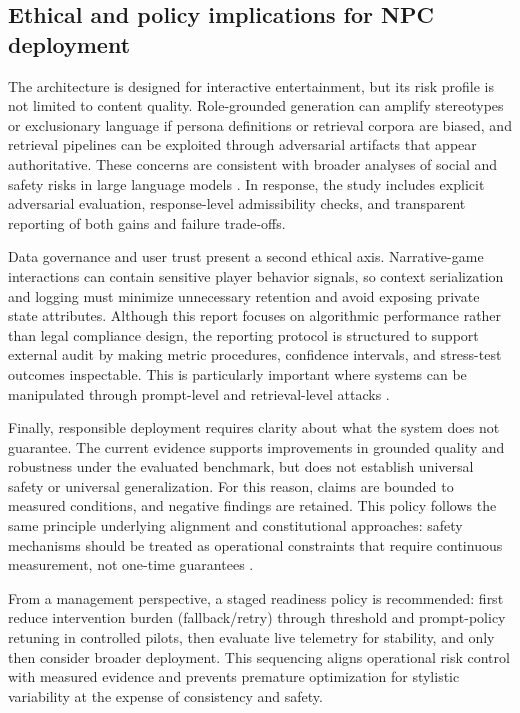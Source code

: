 ﻿\documentclass[a4paper,12pt]{article}
\begin{document}
\subsection{Ethical and policy implications for NPC deployment}
The architecture is designed for interactive entertainment, but its risk profile is not limited to content quality. Role-grounded generation can amplify stereotypes or exclusionary language if persona definitions or retrieval corpora are biased, and retrieval pipelines can be exploited through adversarial artifacts that appear authoritative. These concerns are consistent with broader analyses of social and safety risks in large language models \cite{Bender2021Parrots,Weidinger2022Taxonomy}. In response, the study includes explicit adversarial evaluation, response-level admissibility checks, and transparent reporting of both gains and failure trade-offs.

Data governance and user trust present a second ethical axis. Narrative-game interactions can contain sensitive player behavior signals, so context serialization and logging must minimize unnecessary retention and avoid exposing private state attributes. Although this report focuses on algorithmic performance rather than legal compliance design, the reporting protocol is structured to support external audit by making metric procedures, confidence intervals, and stress-test outcomes inspectable. This is particularly important where systems can be manipulated through prompt-level and retrieval-level attacks \cite{Zou2025PoisonedRAG,Chaturvedi2025AIP}.

Finally, responsible deployment requires clarity about what the system does not guarantee. The current evidence supports improvements in grounded quality and robustness under the evaluated benchmark, but does not establish universal safety or universal generalization. For this reason, claims are bounded to measured conditions, and negative findings are retained. This policy follows the same principle underlying alignment and constitutional approaches: safety mechanisms should be treated as operational constraints that require continuous measurement, not one-time guarantees \cite{Bai2022Constitutional}.

From a management perspective, a staged readiness policy is recommended: first reduce intervention burden (fallback/retry) through threshold and prompt-policy retuning in controlled pilots, then evaluate live telemetry for stability, and only then consider broader deployment. This sequencing aligns operational risk control with measured evidence and prevents premature optimization for stylistic variability at the expense of consistency and safety.
\end{document}
